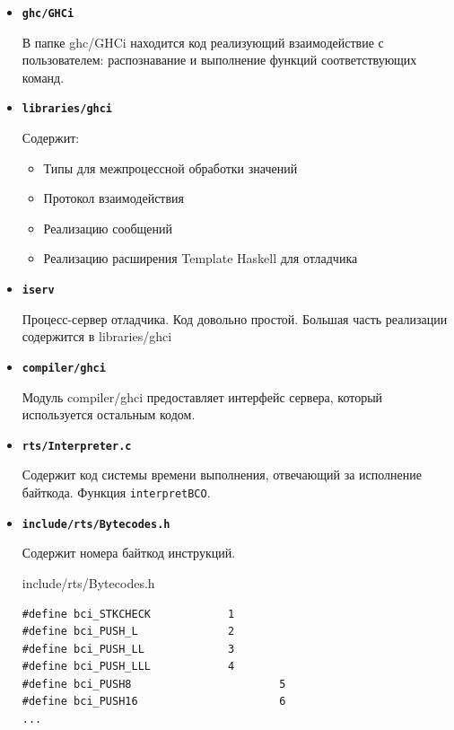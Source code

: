 \documentclass[fontsize=14pt, paper=a4, pagesize, DIV=calc]{scrartcl}
\begin{document}
\begin{itemize}

\item \textbf{\texttt{ghc/GHCi}}

В папке ghc/GHCi находится код реализующий взаимодействие с пользователем:
распознавание и выполнение функций соответствующих команд.

\item \textbf{\texttt{libraries/ghci}}

Содержит:

\begin{itemize}
\item Типы для межпроцессной обработки значений
\item Протокол взаимодействия
\item Реализацию сообщений
\item Реализацию расширения Template Haskell для отладчика
\end{itemize}

\item \textbf{\texttt{iserv}}

Процесс-сервер отладчика. Код довольно простой. Большая часть реализации
содержится в libraries/ghci

\item \textbf{\texttt{compiler/ghci}}

Модуль compiler/ghci предоставляет интерфейс сервера, который используется
остальным кодом.

\item \textbf{\texttt{rts/Interpreter.c}}

Содержит код системы времени выполнения, отвечающий за исполнение байткода. 
Функция \texttt{interpretBCO}.

\item \textbf{\texttt{include/rts/Bytecodes.h}}

Содержит номера байткод инструкций.

\begin{ListingEnv}
\caption{include/rts/Bytecodes.h}
\begin{lstlisting}[firstnumber=26]
#define bci_STKCHECK            1
#define bci_PUSH_L              2
#define bci_PUSH_LL             3
#define bci_PUSH_LLL            4
#define bci_PUSH8                       5
#define bci_PUSH16                      6
...
\end{lstlisting}
\end{ListingEnv}

\end{itemize}
\end{document}
